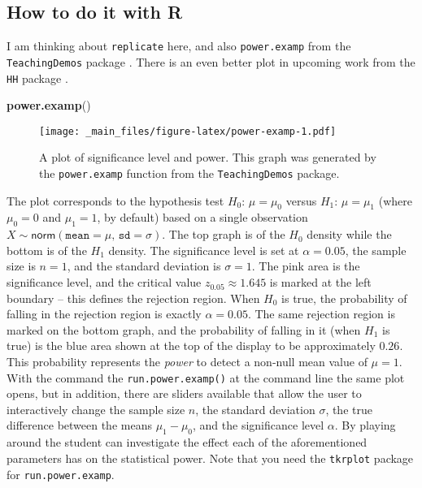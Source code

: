\documentclass[]{book}
\newenvironment{Shaded}{\begin{snugshade}}{\end{snugshade}}
\newcommand{\KeywordTok}[1]{\textcolor[rgb]{0.13,0.29,0.53}{\textbf{{#1}}}}
\newcommand{\NormalTok}[1]{{#1}}
\numberwithin{equation}{chapter}
\numberwithin{figure}{chapter}
\theoremstyle{plain}
\theoremstyle{definition}
\theoremstyle{remark}
\theoremstyle{definition}
\theoremstyle{definition}
\theoremstyle{remark}
\begin{document}
\subsection{How to do it with R}\label{how-to-do-it-with-r-46}

I am thinking about \texttt{replicate}
 here, and also \texttt{power.examp}
 from the \texttt{TeachingDemos}
package \autocite{TeachingDemos}. There is an even better plot in
upcoming work from the \texttt{HH} package \autocite{HH}.

\begin{Shaded}
\begin{Highlighting}[]
\KeywordTok{power.examp}\NormalTok{()}
\end{Highlighting}
\end{Shaded}

\begin{figure}[htbp]
\centering
\texttt{[image: \_main\_files/figure-latex/power-examp-1.pdf]}
\caption{\label{fig:power-examp}\small A plot of significance level and power.
This graph was generated by the \texttt{power.examp} function from the
\texttt{TeachingDemos} package.}
\end{figure}





The plot corresponds to the hypothesis test \(H_{0}:\,\mu=\mu_{0}\)
versus \(H_{1}:\,\mu=\mu_{1}\) (where \(\mu_{0}=0\) and \(\mu_{1}=1\),
by default) based on a single observation
\(X\sim\mathsf{norm}(\mathtt{mean}=\mu,\,\mathtt{sd}=\sigma)\). The top
graph is of the \(H_{0}\) density while the bottom is of the \(H_{1}\)
density. The significance level is set at \(\alpha=0.05\), the sample
size is \(n=1\), and the standard deviation is \(\sigma=1\). The pink
area is the significance level, and the critical value
\(z_{0.05}\approx1.645\) is marked at the left boundary -- this defines
the rejection region. When \(H_{0}\) is true, the probability of falling
in the rejection region is exactly \(\alpha=0.05\). The same rejection
region is marked on the bottom graph, and the probability of falling in
it (when \(H_{1}\) is true) is the blue area shown at the top of the
display to be approximately \(0.26\). This probability represents the
\emph{power} to detect a non-null mean value of \(\mu=1\). With the
command the \texttt{run.power.examp()} at the command line the same plot
opens, but in addition, there are sliders available that allow the user
to interactively change the sample size \(n\), the standard deviation
\(\sigma\), the true difference between the means \(\mu_{1}-\mu_{0}\),
and the significance level \(\alpha\). By playing around the student can
investigate the effect each of the aforementioned parameters has on the
statistical power. Note that you need the \texttt{tkrplot} package
\autocite{tkrplot} for \texttt{run.power.examp}.
\end{document}
